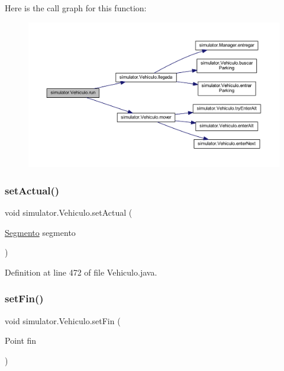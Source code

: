 Here is the call graph for this function\+:\nopagebreak
\begin{figure}[H]
\begin{center}
\leavevmode
\includegraphics[width=350pt]{classsimulator_1_1_vehiculo_a4cbe0a3d742c02919a0c355f42f3e35d_cgraph}
\end{center}
\end{figure}
\mbox{\label{classsimulator_1_1_vehiculo_ae8246a5b77441c21681ffd2033075348}} 
\subsubsection{\texorpdfstring{set\+Actual()}{setActual()}}
{\footnotesize\ttfamily void simulator.\+Vehiculo.\+set\+Actual (\begin{DoxyParamCaption}\item[{\mbox{\hyperlink{classsimulator_1_1_segmento}{Segmento}}}]{segmento }\end{DoxyParamCaption})}



Definition at line 472 of file Vehiculo.\+java.

\mbox{\label{classsimulator_1_1_vehiculo_ac31a172023d50e9ac576ffb0f449bfb8}} 
\subsubsection{\texorpdfstring{set\+Fin()}{setFin()}}
{\footnotesize\ttfamily void simulator.\+Vehiculo.\+set\+Fin (\begin{DoxyParamCaption}\item[{Point}]{fin }\end{DoxyParamCaption})}




